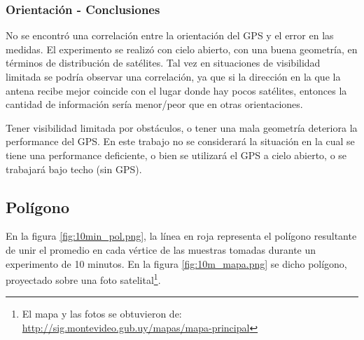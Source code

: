 \documentclass[main]{subfiles}
\begin{document}
\subsubsection{Orientación - Conclusiones}
\label{sec:orientacion-conclusiones}

No se encontró una correlación entre la orientación del GPS y el error en las medidas.
El experimento se realizó con cielo abierto, con una buena geometría, en términos de distribución de satélites. Tal vez en situaciones de visibilidad limitada se podría observar una correlación, ya que si la dirección en la que la antena recibe mejor coincide con el lugar donde hay pocos satélites, entonces la cantidad de información sería menor/peor que en otras orientaciones.

Tener visibilidad limitada por obstáculos, o tener una mala geometría deteriora la performance del GPS. En este trabajo no se considerar\'a la situaci\'on en la cual se tiene una performance deficiente, o bien se utilizar\'a el GPS a cielo abierto, o se trabajar\'a bajo techo (sin GPS).


\subsection{Polígono}
\label{sec:gps2-poligono}

En la figura \ref{fig:10min_pol.png}, la línea en roja representa el polígono resultante de unir el promedio en cada vértice de las muestras tomadas durante un experimento de 10 minutos. En la figura \ref{fig:10m_mapa.png} se dicho polígono, proyectado sobre una foto satelital\footnote{El mapa y las fotos se obtuvieron de:\\ \url{http://sig.montevideo.gub.uy/mapas/mapa-principal}}.
\end{document}
